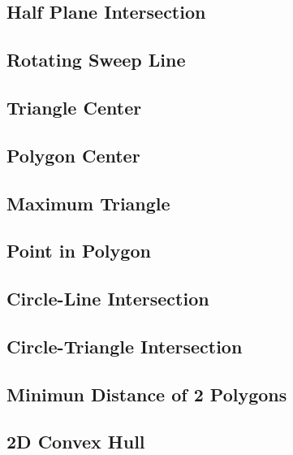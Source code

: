 \documentclass[a4paper,10pt,twocolumn,oneside]{article}
\begin{document}
\subsection{Half Plane Intersection}

\subsection{Rotating Sweep Line}

\subsection{Triangle Center}

\subsection{Polygon Center}

\subsection{Maximum Triangle}

\subsection{Point in Polygon}

\subsection{Circle-Line Intersection}

\subsection{Circle-Triangle Intersection}

% 
\subsection{Minimun Distance of 2 Polygons}

\subsection{2D Convex Hull}

\end{document}
